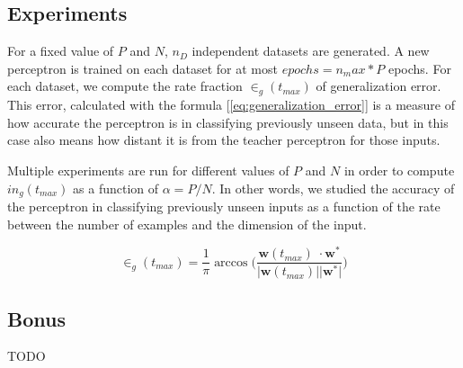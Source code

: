 \subsection{Experiments}
For a fixed value of $P$ and $N$, $n_D$ independent datasets are generated. A new perceptron is trained on each dataset for at most $epochs = n_max * P$ epochs.
For each dataset, we compute the rate fraction $\in_g(t_{max})$ of generalization error. This error, calculated with the formula [\ref{eq:generalization_error}]
is a measure of how accurate the perceptron is in classifying previously unseen data, but in this case also means how distant it is from the teacher perceptron for those inputs.

Multiple experiments are run for different values of $P$ and $N$ in order to compute $in_g(t_{max})$ as a function of $\alpha = P / N$.
In other words, we studied the accuracy of the perceptron in classifying previously unseen inputs as a function of the rate between the number of examples and the dimension of the input.


\begin{equation} \label{eq:generalization_error}
    \in_g(t_{max}) = \frac{1}{\pi} \arccos \bigg(\frac{\mathsf{\bm{w}}(t_{max})\;\cdotp \mathsf{\bm{w}}^*}{\lvert \mathsf{\bm{w}}(t_{max}) \rvert \lvert \mathsf{\bm{w}}^* \rvert} \bigg)
\end{equation}

\subsection{Bonus}
TODO



